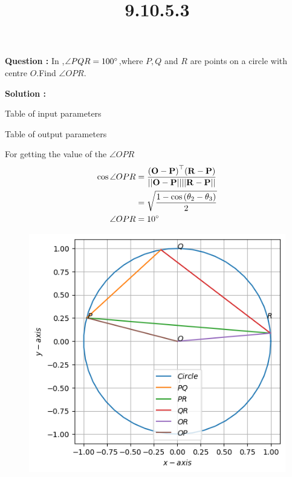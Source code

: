 \documentclass[12pt]{article}
\let\vec\mathbf
\providecommand{\brak}[1]{\ensuremath{\left(#1\right)}}
\providecommand{\norm}[1]{\ensuremath{\lvert|#1\rvert|}}
\begin{document}
\title{\textbf{9.10.5.3}}
\date{}
\maketitle
\textbf{Question :} In  ,$\angle PQR = 100\degree$,where $P,Q$ and $R$ are points on a circle with centre $O$.Find $\angle OPR$.

\textbf{Solution :}
\begin{table}[H]
    \centering
    
    \caption{Table of input parameters}
    \label{tab:tab:1}
\end{table}

\begin{table}[H]
    \centering
    
    \caption{Table of output parameters}
    \label{tab:tab:2}
\end{table}
For getting the value of the $\angle OPR$
\begin{align}
    \cos{\angle OPR }&= \frac{\vec{\brak{O-P}}^{\top}\vec{\brak{R-P}}}{\vec{\norm{O-P}\norm{R-P}}}\\
	&=\sqrt{\frac{1-\cos{\brak{\theta_2-\theta_3}}}{2}}\\
	\angle OPR &= 10\degree
  \end{align}

  \begin{figure}[H]                                 
	  \centering                          
	  \includegraphics[width=\columnwidth]{fig/9.10.5.3.png}
\caption{}
\label{9.10.5.3}                        
  \end{figure}
\end{document}
